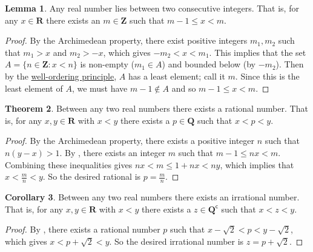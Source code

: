 \documentclass[12pt]{article}
\theoremstyle{definition}
\newtheorem{theorem}{Theorem}
\newtheorem{lemma}[theorem]{Lemma}
\newtheorem{corollary}[theorem]{Corollary}
\newcommand{\setcomp}[1]{#1^{\mathsf{c}}}
\newcommand{\Z}{\mathbf{Z}}
\newcommand{\Q}{\mathbf{Q}}
\newcommand{\R}{\mathbf{R}}
\begin{document}
\begin{lemma}
\label{lem:real_number_lies_between_consecutive_integers}
    Any real number lies between two consecutive integers. That is, for any \( x \in \R \) there exists an \( m \in \Z \) such that \( m - 1 \leq x < m \).
\end{lemma}

\begin{proof}
    By the Archimedean property, there exist positive integers \( m_1, m_2 \) such that \( m_1 > x \) and \( m_2 > - x \), which gives \( -m_2 < x < m_1 \). This implies that the set \( A = \{ n \in \Z : x < n \} \) is non-empty (\( m_1 \in A \)) and bounded below (by \( -m_2 \)). Then by the \href{https://en.wikipedia.org/wiki/Well-ordering_principle}{well-ordering principle}, \( A \) has a least element; call it \( m \). Since this is the least element of \( A \), we must have \( m - 1 \not\in A \) and so \( m - 1 \leq x < m \).
\end{proof}

\begin{theorem}
\label{thm:density_of_Q_in_R}
    Between any two real numbers there exists a rational number. That is, for any \( x, y \in \R \) with \( x < y \) there exists a \( p \in \Q \) such that \( x < p < y \).
\end{theorem}

\begin{proof}
    By the Archimedean property, there exists a positive integer \( n \) such that \( n(y - x) > 1 \). By , there exists an integer \( m \) such that \( m - 1 \leq nx < m \). Combining these inequalities gives \( nx < m \leq 1 + nx < ny \), which implies that \( x < \frac{m}{n} < y \). So the desired rational is \( p = \frac{m}{n} \).
\end{proof}

\begin{corollary}
\label{cor:density_of_Qc_in_R}
    Between any two real numbers there exists an irrational number. That is, for any \( x, y \in \R \) with \( x < y \) there exists a \( z \in \setcomp{\Q} \) such that \( x < z < y \).
\end{corollary}

\begin{proof}
    By , there exists a rational number \( p \) such that \( x - \sqrt{2} < p < y - \sqrt{2} \), which gives \( x < p + \sqrt{2} < y \). So the desired irrational number is \( z = p + \sqrt{2} \).
\end{proof}
\end{document}
